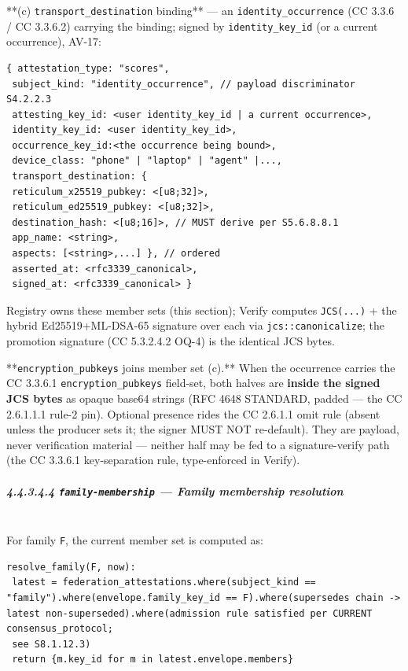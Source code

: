\documentclass[11pt]{article}
\begin{document}
**(c) \texttt{transport\_destination} binding** — an \texttt{identity\_occurrence} (CC 3.3.6 / CC 3.3.6.2) carrying the binding; signed by \texttt{identity\_key\_id} (or a current occurrence), AV-17:

\begin{lstlisting}
{ attestation_type: "scores",
 subject_kind: "identity_occurrence", // payload discriminator S4.2.2.3
 attesting_key_id: <user identity_key_id | a current occurrence>,
 identity_key_id: <user identity_key_id>,
 occurrence_key_id:<the occurrence being bound>,
 device_class: "phone" | "laptop" | "agent" |...,
 transport_destination: {
 reticulum_x25519_pubkey: <[u8;32]>,
 reticulum_ed25519_pubkey: <[u8;32]>,
 destination_hash: <[u8;16]>, // MUST derive per S5.6.8.8.1
 app_name: <string>,
 aspects: [<string>,...] }, // ordered
 asserted_at: <rfc3339_canonical>,
 signed_at: <rfc3339_canonical> }
\end{lstlisting}

Registry owns these member sets (this section); Verify computes \texttt{JCS(...)} + the hybrid Ed25519+ML-DSA-65 signature over each via \texttt{jcs::canonicalize}; the promotion signature (CC 5.3.2.4.2 OQ-4) is the identical JCS bytes.


**\texttt{encryption\_pubkeys} joins member set (c).** When the occurrence carries the CC 3.3.6.1 \texttt{encryption\_pubkeys} field-set, both halves are \textbf{inside the signed JCS bytes} as opaque base64 strings (RFC 4648 STANDARD, padded — the CC 2.6.1.1.1 rule-2 pin). Optional presence rides the CC 2.6.1.1 omit rule (absent unless the producer sets it; the signer MUST NOT re-default). They are payload, never verification material — neither half may be fed to a signature-verify path (the CC 3.3.6.1 key-separation rule, type-enforced in Verify).


\subparagraph{4.4.3.4.4 \texttt{family-membership} — Family membership resolution}\mbox{}\\


For family \texttt{F}, the current member set is computed as:


\begin{lstlisting}
resolve_family(F, now):
 latest = federation_attestations.where(subject_kind == "family").where(envelope.family_key_id == F).where(supersedes chain -> latest non-superseded).where(admission rule satisfied per CURRENT consensus_protocol;
 see S8.1.12.3)
 return {m.key_id for m in latest.envelope.members}
\end{lstlisting}
\end{document}
